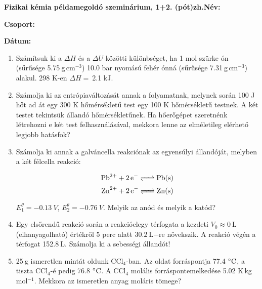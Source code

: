 \documentclass[a4paper, 11pt]{article}
\begin{document}
\textbf{Fizikai kémia példamegoldó szeminárium, 1+2. (pót)zh.}\hfill \textbf{Név:}

\hfill \textbf{Csoport:}

\hfill \textbf{Dátum:}

\thispagestyle{empty}

\begin{enumerate}

\item Számítsuk ki a $\Delta H$ és a $\Delta U$ közötti különbséget, ha 1 mol szürke ón (sűrűsége 5.75$~$g$\,$cm$^{-3}$) 10.0 bar nyomású fehér ónná (sűrűsége 7.31$~$g$\,$cm$^{-3}$) alakul. 298 K-en $\Delta H=~$2.1 kJ.

\item Számolja ki az entrópiaváltozását annak a folyamatnak, melynek során 100 J hőt ad át egy 300 K hőmérsékletű test egy 100 K hőmérsékletű testnek. A két testet tekintsük állandó hőmérsékletűnek. Ha hőerőgépet szeretnénk létrehozni e két test felhasználásával, mekkora lenne az elméletileg elérhető legjobb hatásfok?

\item Számolja ki annak a galváncella reakciónak az egyensúlyi állandóját, melyben a két félcella reakció:

\begin{equation}
        \ce{Pb^{2+} + 2e^- <=> Pb(s)}
\end{equation}
\begin{equation}
        \ce{Zn^{2+} + 2e^- <=> Zn(s)}
\end{equation}

$E_1^\theta=-0.13~V$, $E_2^\theta=-0.76~V$. Melyik az anód és melyik a katód?

\item Egy elsőrendű reakció során a reakcióelegy térfogata a kezdeti $V_0\approx0~$L (elhanyagolható) értékről 5 perc alatt $30.2~$L$-$re növekszik. A reakció végén a térfogat 152.8$~$L. Számolja ki a sebességi állandót!

\item 25$~$g ismeretlen mintát oldunk CCl$_4$-ban. Az oldat forráspontja 77.4$~\celsius$, a tiszta CCl$_4$-é pedig 76.8$~\celsius$. A CCl$_4$ molális forráspontemelkedése 5.02 K$\,$kg$\,$mol$^{-1}$. Mekkora az ismeretlen anyag moláris tömege?

\end{enumerate}
\end{document}
